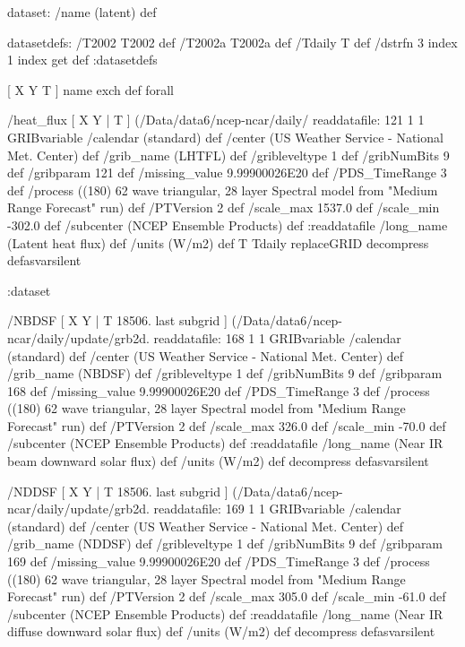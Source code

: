 \begin{ingrid}

  dataset: /name (latent) def

   datasetdefs:
   /T2002 T2002 def
   /T2002a T2002a def
   /Tdaily T def
   /dstrfn 3 index 1 index get def
   :datasetdefs
   
   [ X Y T ] { name exch def } forall
 
   /heat_flux { [ X Y | T ] (/Data/data6/ncep-ncar/daily/%
   readdatafile:
   121 1 1 GRIBvariable
   /calendar (standard) def
   /center (US Weather Service - National Met. Center) def
   /grib_name (LHTFL) def
   /gribleveltype 1 def
   /gribNumBits 9 def
   /gribparam 121 def
   /missing_value 9.99900026E20 def 
   /PDS_TimeRange 3 def
   /process ((180) 62 wave triangular, 28 layer Spectral model from "Medium Range Forecast" run) def
   /PTVersion 2 def
   /scale_max 1537.0 def
   /scale_min -302.0 def
   /subcenter (NCEP Ensemble Products) def
   :readdatafile
   /long_name (Latent heat flux) def
   /units (W/m2) def
   T Tdaily replaceGRID 
   decompress
   } defasvarsilent

  :dataset

  /NBDSF { [ X Y | T 18506. last subgrid ] (/Data/data6/ncep-ncar/daily/update/grb2d.%
  readdatafile:
  168 1 1 GRIBvariable
  /calendar (standard) def
  /center (US Weather Service - National Met. Center) def
  /grib_name (NBDSF) def
  /gribleveltype 1 def
  /gribNumBits 9 def
  /gribparam 168 def
  /missing_value 9.99900026E20 def 
  /PDS_TimeRange 3 def
  /process ((180) 62 wave triangular, 28 layer Spectral model from "Medium Range Forecast" run) def
  /PTVersion 2 def
  /scale_max 326.0 def
  /scale_min -70.0 def
  /subcenter (NCEP Ensemble Products) def
  :readdatafile
  /long_name (Near IR beam downward solar flux) def
  /units (W/m2) def
  decompress
  } defasvarsilent
  
  /NDDSF { [ X Y | T 18506. last subgrid ] (/Data/data6/ncep-ncar/daily/update/grb2d.%
  readdatafile:
  169 1 1 GRIBvariable
  /calendar (standard) def
  /center (US Weather Service - National Met. Center) def
  /grib_name (NDDSF) def
  /gribleveltype 1 def
  /gribNumBits 9 def
  /gribparam 169 def
  /missing_value 9.99900026E20 def 
  /PDS_TimeRange 3 def
  /process ((180) 62 wave triangular, 28 layer Spectral model from "Medium Range Forecast" run) def
  /PTVersion 2 def
  /scale_max 305.0 def
  /scale_min -61.0 def
  /subcenter (NCEP Ensemble Products) def
  :readdatafile
  /long_name (Near IR diffuse downward solar flux) def
  /units (W/m2) def
  decompress
  } defasvarsilent
  

\end{ingrid}
